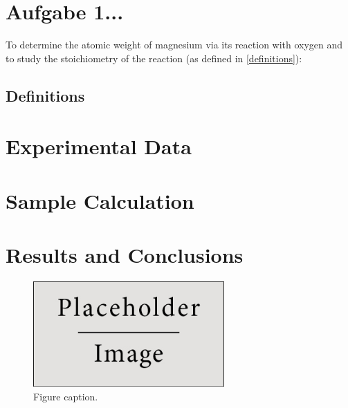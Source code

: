 
\section{Aufgabe 1...}

To determine the atomic weight of magnesium via its reaction with oxygen and to study the stoichiometry of the reaction (as defined in \ref{definitions}):



\subsection{Definitions}

 

\section{Experimental Data}



\section{Sample Calculation}


\section{Results and Conclusions}

\begin{figure}[h]
\begin{center}
\includegraphics[width=0.65\textwidth]{imgs/placeholder} %
\caption{Figure caption.}
\end{center}
\end{figure}

